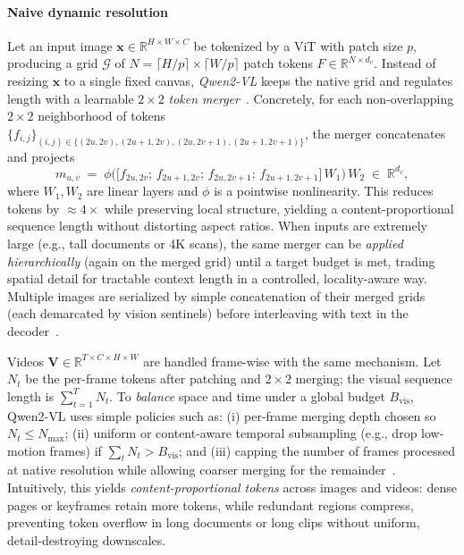 \begin{enrichment}
\begin{enrichment}
        \paragraph{Naive dynamic resolution}
        Let an input image $\mathbf{x}\!\in\!\mathbb{R}^{H\times W\times C}$ be tokenized by a ViT with patch size $p$, producing a grid $\mathcal{G}$ of $N{=}\lceil H/p\rceil\!\times\!\lceil W/p\rceil$ patch tokens $F\!\in\!\mathbb{R}^{N\times d_v}$. Instead of resizing $\mathbf{x}$ to a single fixed canvas, \emph{Qwen2\mbox{-}VL} keeps the native grid and regulates length with a learnable $2{\times}2$ \emph{token merger}~\cite{wang2024_qwen2vl}. Concretely, for each non\mbox{-}overlapping $2{\times}2$ neighborhood of tokens $\{f_{i,j}\}_{(i,j)\in\{(2u,2v),(2u{+}1,2v),(2u,2v{+}1),(2u{+}1,2v{+}1)\}}$, the merger concatenates and projects
        \[
        m_{u,v}\;=\;\phi\!\Big(\big[f_{2u,2v};\,f_{2u{+}1,2v};\,f_{2u,2v{+}1};\,f_{2u{+}1,2v{+}1}\big]\,W_1\Big)\,W_2
        \;\in\;\mathbb{R}^{d_v},
        \]
        where $W_1,W_2$ are linear layers and $\phi$ is a pointwise nonlinearity. This reduces tokens by $\approx 4{\times}$ while preserving local structure, yielding a content\mbox{-}proportional sequence length without distorting aspect ratios. When inputs are extremely large (e.g., tall documents or 4K scans), the same merger can be \emph{applied hierarchically} (again on the merged grid) until a target budget is met, trading spatial detail for tractable context length in a controlled, locality\mbox{-}aware way. Multiple images are serialized by simple concatenation of their merged grids (each demarcated by vision sentinels) before interleaving with text in the decoder~\cite{wang2024_qwen2vl}.
        
        Videos $\mathbf{V}\!\in\!\mathbb{R}^{T\times C\times H\times W}$ are handled frame\mbox{-}wise with the same mechanism. Let $N_t$ be the per\mbox{-}frame tokens after patching and $2{\times}2$ merging; the visual sequence length is $\sum_{t=1}^{T}\!N_t$. To \emph{balance} space and time under a global budget $B_{\mathrm{vis}}$, Qwen2\mbox{-}VL uses simple policies such as: (i) per\mbox{-}frame merging depth chosen so $N_t\!\le\!N_{\max}$; (ii) uniform or content\mbox{-}aware temporal subsampling (e.g., drop low\mbox{-}motion frames) if $\sum_t N_t\!>\!B_{\mathrm{vis}}$; and (iii) capping the number of frames processed at native resolution while allowing coarser merging for the remainder~\cite{wang2024_qwen2vl}. Intuitively, this yields \emph{content\mbox{-}proportional tokens} across images and videos: dense pages or keyframes retain more tokens, while redundant regions compress, preventing token overflow in long documents or long clips without uniform, detail\mbox{-}destroying downscales.
        

\end{enrichment}
\end{enrichment}

